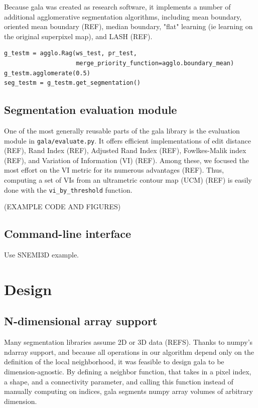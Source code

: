 \documentclass{frontiersSCNS} %
\begin{document}
Because gala was created as research software, it implements a number of additional agglomerative segmentation algorithms, including mean boundary, oriented mean boundary (REF), median boundary, "flat" learning (ie learning on the original superpixel map), and LASH (REF).

{\small
\begin{verbatim}
g_testm = agglo.Rag(ws_test, pr_test,
                    merge_priority_function=agglo.boundary_mean)
g_testm.agglomerate(0.5)
seg_testm = g_testm.get_segmentation()
\end{verbatim}
}

\subsection{Segmentation evaluation module}

One of the most generally reusable parts of the gala library is the evaluation module in \texttt{gala/evaluate.py}.
It offers efficient implementations of edit distance (REF), Rand Index (REF), Adjusted Rand Index (REF), Fowlkes-Malik index (REF), and Variation of Information (VI) (REF).
Among these, we focused the most effort on the VI metric for its numerous advantages (REF).
Thus, computing a set of VIs from an ultrametric contour map (UCM) (REF) is easily done with the \texttt{vi\_by\_threshold} function.

(EXAMPLE CODE AND FIGURES)

\subsection{Command-line interface}

Use SNEMI3D example.


\section{Design}


\subsection{N-dimensional array support}
Many segmentation libraries assume 2D or 3D data (REFS).
Thanks to numpy's ndarray support, and because all operations in our algorithm depend only on the definition of the local neighborhood, it was feasible to design gala to be dimension-agnostic.
By defining a neighbor function, that takes in a pixel index, a shape, and a connectivity parameter, and calling this function instead of manually computing on indices, gala segments numpy array volumes of arbitrary dimension.
\end{document}

